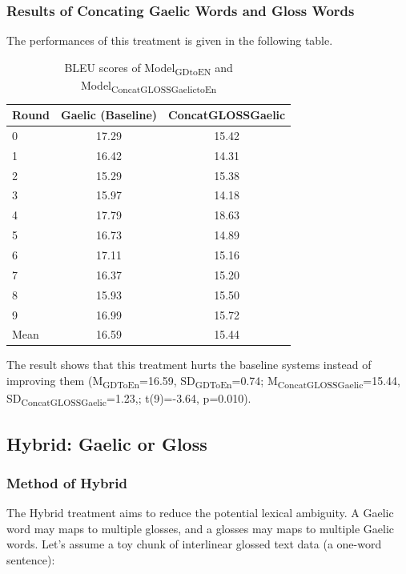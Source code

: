 \documentclass[final]{ua-thesis}
\numberwithin{equation}{section}
\begin{document}
\subsubsection{Results of Concating Gaelic Words and Gloss Words}
The performances of this treatment is given in the following table.
\begin{table}[ht]
\centering
\begin{tabular}{lcc}
  \hline
Round & Gaelic (Baseline) & ConcatGLOSSGaelic \\ 
  \hline
0 & 17.29 & 15.42 \\ 
  1 & 16.42 & 14.31 \\ 
  2 & 15.29 & 15.38 \\ 
  3 & 15.97 & 14.18 \\ 
  4 & 17.79 & 18.63 \\ 
  5 & 16.73 & 14.89 \\ 
  6 & 17.11 & 15.16 \\ 
  7 & 16.37 & 15.20 \\ 
  8 & 15.93 & 15.50 \\ 
  9 & 16.99 & 15.72 \\ 
   \hline
Mean & 16.59 & 15.44 \\ 
   \hline
\end{tabular}
\caption{BLEU scores of Model\textsubscript{GDtoEN} and Model\textsubscript{ConcatGLOSSGaelictoEn} } 
\label{Table:Concating}
\end{table}\newline
The result shows that this treatment hurts the baseline systems instead of improving them (M\textsubscript{GDToEn}=16.59, SD\textsubscript{GDToEn}=0.74; M\textsubscript{ConcatGLOSSGaelic}=15.44, SD\textsubscript{ConcatGLOSSGaelic}=1.23,; t(9)=-3.64, p=0.010).

\subsection{Hybrid: Gaelic or Gloss}
\subsubsection{Method of Hybrid}
The Hybrid treatment aims to reduce the potential lexical ambiguity. A Gaelic word may maps to multiple glosses, and a glosses may maps to multiple Gaelic words. Let's assume a toy chunk of interlinear glossed text data (a one-word sentence): 
\end{document}
